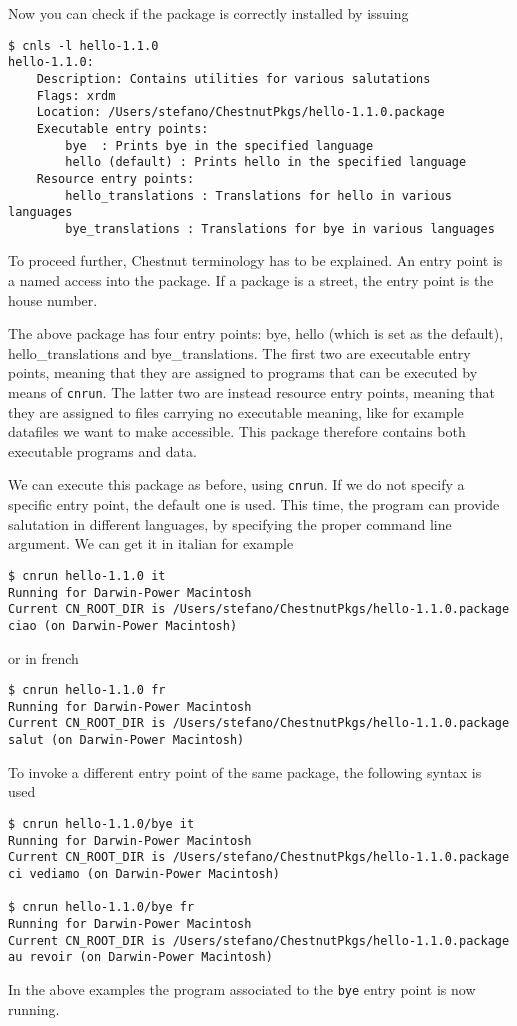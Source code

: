 Now you can check if the package is correctly installed by issuing

\begin{verbatim}
$ cnls -l hello-1.1.0
hello-1.1.0:
    Description: Contains utilities for various salutations
    Flags: xrdm
    Location: /Users/stefano/ChestnutPkgs/hello-1.1.0.package
    Executable entry points:
        bye  : Prints bye in the specified language
        hello (default) : Prints hello in the specified language
    Resource entry points:
        hello_translations : Translations for hello in various languages
        bye_translations : Translations for bye in various languages
\end{verbatim}
To proceed further, Chestnut terminology has to be explained. An entry point is
a named access into the package. If a package is a street, the entry point is
the house number. 

The above package has four entry points: bye, hello (which is set as the
default), hello\_translations and bye\_translations. The first two are executable
entry points, meaning that they are assigned to programs that can be executed
by means of \verb+cnrun+. The latter two are instead resource entry points,
meaning that they are assigned to files carrying no executable meaning, like
for example datafiles we want to make accessible. This package therefore
contains both executable programs and data.

We can execute this package as before, using \verb+cnrun+. If we do not specify
a specific entry point, the default one is used.  This time, the program can
provide salutation in different languages, by specifying the proper command
line argument. We can get it in italian for example
\begin{verbatim}
$ cnrun hello-1.1.0 it
Running for Darwin-Power Macintosh
Current CN_ROOT_DIR is /Users/stefano/ChestnutPkgs/hello-1.1.0.package
ciao (on Darwin-Power Macintosh)
\end{verbatim}
or in french
\begin{verbatim}
$ cnrun hello-1.1.0 fr
Running for Darwin-Power Macintosh
Current CN_ROOT_DIR is /Users/stefano/ChestnutPkgs/hello-1.1.0.package
salut (on Darwin-Power Macintosh)
\end{verbatim}
To invoke a different entry point of the same package, the following syntax is used
\begin{verbatim}
$ cnrun hello-1.1.0/bye it
Running for Darwin-Power Macintosh
Current CN_ROOT_DIR is /Users/stefano/ChestnutPkgs/hello-1.1.0.package
ci vediamo (on Darwin-Power Macintosh)

$ cnrun hello-1.1.0/bye fr
Running for Darwin-Power Macintosh
Current CN_ROOT_DIR is /Users/stefano/ChestnutPkgs/hello-1.1.0.package
au revoir (on Darwin-Power Macintosh)
\end{verbatim}
In the above examples the program associated to the \verb+bye+ entry point is now running.

